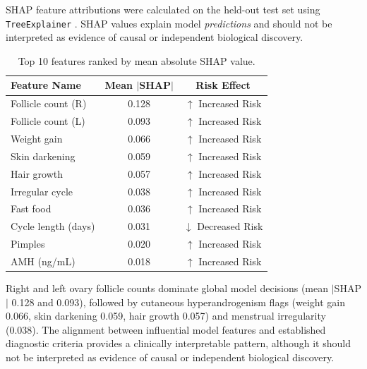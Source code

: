 \documentclass[10pt,twocolumn,a4paper]{article}
\begin{document}
SHAP feature attributions were calculated on the held-out test set using \texttt{TreeExplainer} \cite{lundberg2017shap}.
SHAP values explain model \emph{predictions} and should not be interpreted as evidence of causal or independent biological discovery.

\begin{table}[htbp]
\centering
\caption{Top 10 features ranked by mean absolute SHAP value.}
\label{tab:shap}
\vspace{2pt}
\setlength{\tabcolsep}{3.5pt}
\small
\begin{tabular}{@{}l c c@{}}
\toprule
Feature Name & Mean $|$SHAP$|$ & Risk Effect \\
\midrule
Follicle count (R) & 0.128 & $\uparrow$ Increased Risk \\
Follicle count (L) & 0.093 & $\uparrow$ Increased Risk \\
Weight gain        & 0.066 & $\uparrow$ Increased Risk \\
Skin darkening     & 0.059 & $\uparrow$ Increased Risk \\
Hair growth        & 0.057 & $\uparrow$ Increased Risk \\
Irregular cycle    & 0.038 & $\uparrow$ Increased Risk \\
Fast food          & 0.036 & $\uparrow$ Increased Risk \\
Cycle length (days)& 0.031 & $\downarrow$ Decreased Risk \\
Pimples            & 0.020 & $\uparrow$ Increased Risk \\
AMH (ng/mL)        & 0.018 & $\uparrow$ Increased Risk \\
\bottomrule
\end{tabular}
\end{table}

Right and left ovary follicle counts dominate global model decisions (mean $|$SHAP$|$ 0.128 and 0.093), followed by cutaneous hyperandrogenism flags
(weight gain 0.066, skin darkening 0.059, hair growth 0.057) and menstrual irregularity (0.038).
The alignment between influential model features and established diagnostic criteria provides a clinically interpretable pattern, although it should not
be interpreted as evidence of causal or independent biological discovery.

\FloatBarrier
\end{document}
